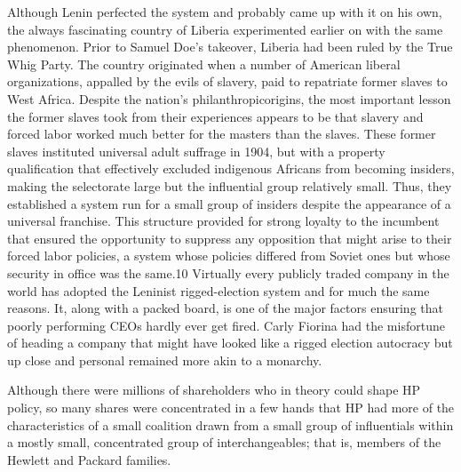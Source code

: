 \documentclass[10pt]{article}
\begin{document}
{\large Although Lenin perfected the system and probably came up with it on his
own, the always fascinating country of Liberia experimented earlier on with the
same phenomenon. Prior to Samuel Doe's takeover, Liberia had been ruled by the
True Whig Party. The country originated when a number of American liberal
organizations, appalled by the evils of slavery, paid to repatriate former slaves
to West Africa. Despite the nation's philanthropicorigins, the most important
lesson the former slaves took from their experiences appears to be that slavery
and forced labor worked much better for the masters than the slaves. These former
slaves instituted universal adult suffrage in 1904, but with a property
qualification that effectively excluded indigenous Africans from becoming
insiders, making the selectorate large but the influential group relatively
small. Thus, they established a system run for a small group of insiders despite
the appearance of a universal franchise. This structure provided for strong
loyalty to the incumbent that ensured the opportunity to suppress any opposition
that might arise to their forced labor policies, a system whose policies differed
from Soviet ones but whose security in office was the same.10 Virtually every
publicly traded company in the world has adopted the Leninist rigged-election
system and for much the same reasons. It, along with a packed board, is one of
the major factors ensuring that poorly performing CEOs hardly ever get fired.
Carly Fiorina had the misfortune of heading a company that might have looked like
a rigged election autocracy but up close and personal remained more akin to a
monarchy.}

{\large Although there were millions of shareholders who in theory could shape
HP policy, so many shares were concentrated in a few hands that HP had more of
the characteristics of a small coalition drawn from a small group of influentials
within a mostly small, concentrated group of interchangeables; that is, members
of the Hewlett and Packard families.}
\end{document}
